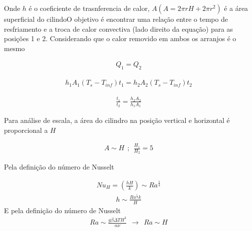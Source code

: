 \documentclass[12pt]{article}
\begin{document}
Onde $h$ é o coeficiente de trasnferencia de calor, $A  (A= 2\pi rH + 2\pi r^{2})$ é a área superficial do cilindoO objetivo é encontrar uma relação entre o tempo de resfriamento e a troca de calor convectiva (lado direito da equação) para as posições 1 e 2. Considerando que o calor removido em ambos os arranjos é o mesmo

\begin{equation}
	\begin{aligned}
		Q_{1} = Q_{2}
	\end{aligned}
\end{equation}

\begin{equation}
	\begin{aligned}
		h_{1}A_{1}(T_{s}-T_{inf})t_{1} = h_{2}A_{2}(T_{s}-T_{inf})t_{2}
	\end{aligned}
\end{equation}

\begin{equation}
	\begin{aligned}
		\frac{t_{1} }{t_{2}}= \frac{h_{2}A_{2}}{h_{1}A_{1}}
	\end{aligned}
\end{equation}

Para análise de escala, a área do cilindro na posição vertical e horizontal é proporcional a $H$

\begin{equation}
	\begin{aligned}
		A \sim H \ \ ; \ \ \frac{H_{1}}{H_{2}} = 5
	\end{aligned}
\end{equation}

Pela definição do número de Nusselt

\begin{equation}
	\begin{aligned}
		Nu_{H} = \left( \frac{hH}{k}\right) \sim Ra^{\frac{1}{4}}
	\end{aligned}
\end{equation}
\begin{equation}
	\begin{aligned}
		 h \sim \frac{Ra^{\frac{1}{4}}k}{H}
	\end{aligned}
\end{equation}
E pela definição do número de Nusselt
\begin{equation}
	\begin{aligned}
		 Ra\sim \frac{g\beta \Delta T H^{3}}{\alpha \nu} \ \ \rightarrow \ \ Ra \sim H
	\end{aligned}
\end{equation}
\end{document}
